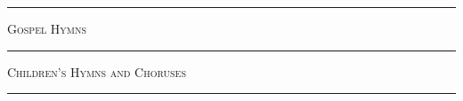 \documentclass{book}
\begin{document}
\begin{multicols}{2}
{\small
\setlength\baselineskip{10pt plus 1pt}

}
\end{multicols}
\noindent\hfil\rule{0.5\textwidth}{.4pt}\hfil\vfill\bigbreak

{\hfill\large\textsc{Gospel Hymns}\hfill}
\begin{multicols}{2}
{\small
\setlength\baselineskip{10pt plus 1pt}

}
\end{multicols}
\noindent\hfil\rule{0.5\textwidth}{.4pt}\hfil\vfill\bigbreak

\begin{minipage}{\textwidth} %
{\hfill\large\textsc{Children’s Hymns and Choruses}\hfill}
\begin{multicols}{2}
{\small
\setlength\baselineskip{10pt plus 1pt}

}
\end{multicols}
\noindent\hfil\rule{0.5\textwidth}{.4pt}\hfil
\end{minipage}
\end{document}
